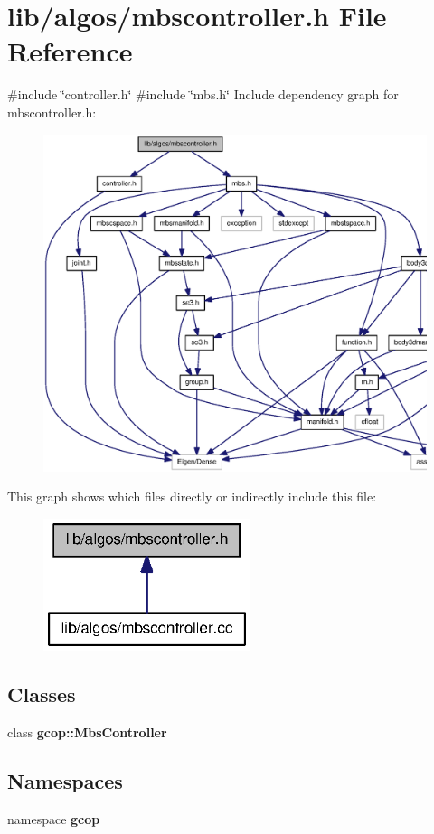 \section{lib/algos/mbscontroller.h \-File \-Reference}
\label{mbscontroller_8h}
{\ttfamily \#include \char`\"{}controller.\-h\char`\"{}}\*
{\ttfamily \#include \char`\"{}mbs.\-h\char`\"{}}\*
\-Include dependency graph for mbscontroller.\-h\-:
\nopagebreak
\begin{figure}[H]
\begin{center}
\leavevmode
\includegraphics[width=350pt]{mbscontroller_8h__incl}
\end{center}
\end{figure}
\-This graph shows which files directly or indirectly include this file\-:
\nopagebreak
\begin{figure}[H]
\begin{center}
\leavevmode
\includegraphics[width=172pt]{mbscontroller_8h__dep__incl}
\end{center}
\end{figure}
\subsection*{\-Classes}
\begin{DoxyCompactItemize}
\item 
class {\bf gcop\-::\-Mbs\-Controller}
\end{DoxyCompactItemize}
\subsection*{\-Namespaces}
\begin{DoxyCompactItemize}
\item 
namespace {\bf gcop}
\end{DoxyCompactItemize}
